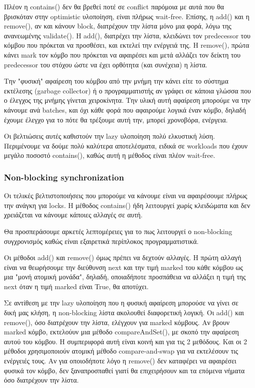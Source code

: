 \documentclass[../final_report.tex]{subfiles}
\begin{document}
Πλέον η contains() δεν θα βρεθεί ποτέ σε conflict παρόμοια με αυτά που θα βρισκόταν στην optimistic υλοποίηση,
είναι πλήρως wait-free. Επίσης, η add() και η remove(), αν και κάνουν block, διατρέχουν την λίστα μόνο μια φορά, λόγω της ανανεωμένης validate().
Η add(), διατρέχει την λίστα, κλειδώνει τον predecessor του κόμβου που πρόκεται να προσθέσει, και εκτελεί την ενέργειά της.
Η remove(), πρώτα κάνει mark τον κόμβο που πρόκεται να αφαιρέσει και μετά αλλάζει τον δείκτη του predecessor του στόχου ώστε να έχει
ορθότητα (και συνέχεια) η λίστα.

Την "φυσική" αφαίρεση του κόμβου από την μνήμη την κάνει είτε το σύστημα εκτέλεσης (garbage collector) ή ο προγραμματιστής αν 
γράφει σε κάποια γλώσσα που ο έλεγχος της μνήμης γίνεται χειροκίνητα. Την υλική αυτή αφαίρεση μπορούμε να την κάνουμε ανά batches,
και όχι κάθε φορά που αφαιρούμε λογικά έναν κόμβο, δηλαδή έχουμε έλεγχο για το πότε θα τρέξουμε αυτή την, μπορεί χρονοβόρα, ενέργεια.

Οι βελτιώσεις αυτές καθιστούν την lazy υλοποίηση πολύ ελκυστική λύση. Περιμένουμε να δούμε πολύ καλύτερα αποτελέσματα, ειδικά 
σε workloads που έχουν μεγάλο ποσοστό contains(), καθώς αυτή η μέθοδος είναι πλέον wait-free. 

\subsubsection{Non-blocking synchronization}
Οι τελικές βελτιστοποιήσεις που μπορούμε να κάνουμε είναι να αφαιρέσουμε πλήρως την ανάγκη για locks. Η μέθοδος contains() ήδη λειτουργεί
χωρίς κλειδώματα και δεν χρειάζεται να κάνουμε κάποιες αλλαγές σε αυτή.

Θα προσπεράσουμε αρκετές λεπτομέρειες για το πως λειτουργεί ο non-blocking συγχρονισμός καθώς είναι εξαιρετικά περίπλοκος προγραμματιστικά.

Οι μέθοδοι add() και remove() όμως πρέπει να δεχτούν αλλαγές. Η πρώτη αλλαγή είναι να θεωρήσουμε την διεύθυνση next και την τιμή
marked του κάθε κόμβου ως μια "μονή ατομική μονάδα", δηλαδή, οποιαδήποτε προσπάθεια να αλλάξει η τιμή της next όταν η τιμή marked είναι
True, θα αποτύχει.

Σε αντίθεση με την lazy υλοποίηση που η φυσική αφαίρεση μπορούσε να γίνει σε δική μας κλήση, η non-blocking λίστα ακολουθεί διαφορετική λογική.
Οι add() και remove(), όσο διατρέχουν την λίστα, ελέγχουν για marked κόμβους. Αν βρουν marked κόμβο, εκτελούυν μια μέθοδο compareAndSet(), με σκοπό
την αφαίρεση αυτού του κόμβου. Η συμπεριφορά αυτή είναι κοινή και για τις 2 μεθόδους. Και οι 2 μέθοδοι χρησιμοποιούν ατομική μέθοδο compare-and-swap
για να εκτελέσουν τις ενέργειές τους. Αν για οποιοδήποτε λόγο η remove() δεν καταφέρει να αφαιρέσει φυσικά τον κόμβο, δεν ξαναπροσπαθεί γιατί 
θα επιχειρήσουν και τα επόμενα νήματα όσο διατρέχουν την λίστα.
\end{document}

